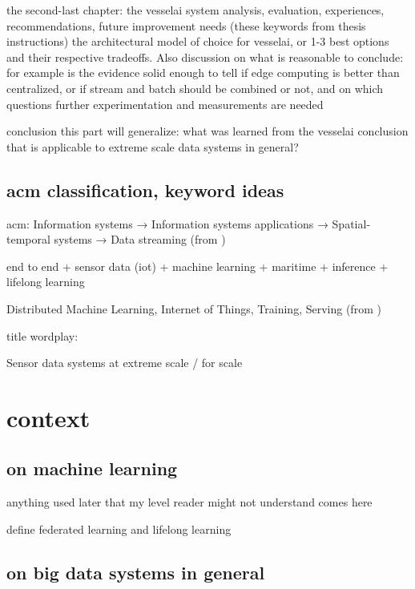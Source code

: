 the second-last chapter:  the vesselai system
analysis, evaluation, experiences, recommendations, future improvement needs (these keywords from thesis instructions)
the architectural model of choice for vesselai, or 1-3 best options and their respective tradeoffs. Also discussion on what is reasonable to conclude: for example is the evidence solid enough to tell if edge computing is better than centralized, or
if stream and batch should be combined or not, and on which questions further experimentation and measurements are needed

conclusion
this part will generalize: what was learned from the vesselai conclusion that is applicable to extreme scale data systems in general?

\section{acm classification,  keyword ideas}

acm:
Information systems → Information systems applications →
Spatial-temporal systems → Data streaming (from \cite{uprctrajectorysystem})

end to end + sensor data (iot) + machine learning + maritime + inference + lifelong learning

Distributed Machine Learning, Internet of Things, Training, Serving (from \cite{mliot})

title wordplay:

Sensor data systems at extreme scale / for scale

\chapter{context}

\section{on machine learning}

anything used later that my level reader might not understand comes here

define federated learning and lifelong learning

\section{on big data systems in general}

